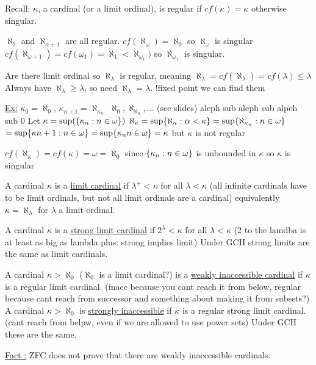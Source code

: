 Recall: $\kappa$, a cardinal (or a limit ordinal), is regular if $cf(\kappa) = \kappa$ otherwise singular.

$\aleph_0$ and $\aleph_{\alpha+1}$ are all regular.
$cf(\aleph_\omega) = \aleph_0$ so $\aleph_\omega$ is singular
$cf(\aleph_{\omega+1}) = cf(\omega_1) = \aleph_1 < \aleph_{\omega_1})$ so $\aleph_{\omega_1}$ is singular.

Are there limit ordinal so $\aleph_\lambda$ is regular, meaning $\aleph_\lambda = cf(\aleph_\lambda) = cf(\lambda) \leq \lambda$
Always have $\aleph_\lambda \geq \lambda$, so need $\aleph_\lambda = \lambda$.
!fixed point we can find them

\underline{Ex:} $\kappa_0 = \aleph_0$, $\kappa_{n+1} = \aleph_{\kappa_n}$
$\aleph_0, \aleph_{\aleph_0}, \dots$ (see slides) aleph sub aleph sub alpeh sub 0
Let $\kappa = \sup (\{\kappa_n : n \in \omega\})$
$\aleph_\kappa = \sup \{ \aleph_\alpha : \alpha < \kappa\} = \sup \{ \aleph_{\kappa_n}: n \in \omega\}$
$= \sup \{\kappa{n+1}: n \in \omega\}= \sup \{\kappa_n  n \in \omega\} = \kappa$ but $\kappa$ is not regular

$cf(\aleph_\kappa) = cf(\kappa) = \omega = \aleph_0$ since $\{\kappa_n : n \in \omega\}$ is unbounded in $\kappa$
so $\kappa$ is singular

\dfn A cardinal $\kappa$ is a \underline{limit cardinal} if $\lambda^+ < \kappa$ for all $\lambda < \kappa$
(all infinite cardinals have to be limit ordinals, but not all limit ordinals are a cardinal)
equivalently $\kappa = \aleph_\lambda$ for $\lambda$ a limit ordinal.

\dfn A cardinal $\kappa$ is a \underline{strong limit cardinal} if $2^\lambda < \kappa$ for all $\lambda < \kappa$
(2 to the lamdba is at least as big as lambda plus: strong implies limit)
Under GCH strong limits are the same as limit cardinals.

\dfn A cardinal $\kappa > \aleph_0$ ($\aleph_0$ is a limit cardinal?) is a \underline{weakly inaccessible cardinal} if $\kappa$ is a regular limit cardinal.
(inacc because you cant reach it from below, regular because cant reach from successor and something about making it from subsets?)
A cardinal $\kappa > \aleph_0$ is \underline{strongly inaccessible} if $\kappa$ is a regular strong limit cardinal.
(cant reach from belpw, even if we are allowed to use power sets)
Under GCH these are the same.

\underline{Fact :} ZFC does not prove that there are weakly inaccessible cardinals.

